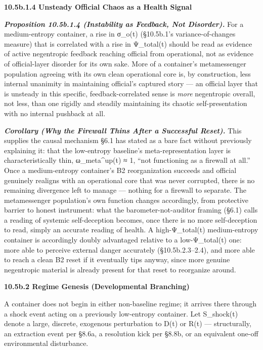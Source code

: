 \documentclass[
]{article}
\begin{document}
\textbf{10.5b.1.4 Unsteady Official Chaos as a Health Signal}

\emph{\textbf{Proposition 10.5b.1.4 (Instability as Feedback, Not
Disorder).}} For a medium-entropy container, a rise in σ\_o(t)
(§10.5b.1's variance-of-changes measure) that is correlated with a rise
in Ψ\_total(t) should be read as evidence of active negentropic feedback
reaching official from operational, not as evidence of official-layer
disorder for its own sake. More of a container's metamessenger
population agreeing with its own clean operational core is, by
construction, less internal unanimity in maintaining official's captured
story --- an official layer that is unsteady in this specific,
feedback-correlated sense is \emph{more} negentropic overall, not less,
than one rigidly and steadily maintaining its chaotic self-presentation
with no internal pushback at all.

\emph{\textbf{Corollary (Why the Firewall Thins After a Successful
Reset).}} This supplies the causal mechanism §6.1 has stated as a bare
fact without previously explaining it: that the low-entropy baseline's
meta-representation layer is characteristically thin, ω\_meta\^{}up(t) ≈
1, ``not functioning as a firewall at all.'' Once a medium-entropy
container's B2 reorganization succeeds and official genuinely realigns
with an operational core that was never corrupted, there is no remaining
divergence left to manage --- nothing for a firewall to separate. The
metamessenger population's own function changes accordingly, from
protective barrier to honest instrument: what the barometer-not-auditor
framing (§6.1) calls a reading of systemic self-deception becomes, once
there is no more self-deception to read, simply an accurate reading of
health. A high-Ψ\_total(t) medium-entropy container is accordingly
doubly advantaged relative to a low-Ψ\_total(t) one: more able to
perceive external danger accurately (§10.5b.2.3--2.4), and more able to
reach a clean B2 reset if it eventually tips anyway, since more genuine
negentropic material is already present for that reset to reorganize
around.

\textbf{10.5b.2 Regime Genesis (Developmental Branching)}

A container does not begin in either non-baseline regime; it arrives
there through a shock event acting on a previously low-entropy
container. Let S\_shock(t) denote a large, discrete, exogenous
perturbation to D(t) or R(t) --- structurally, an extraction event per
§8.6a, a resolution kick per §8.8b, or an equivalent one-off
environmental disturbance.
\end{document}
